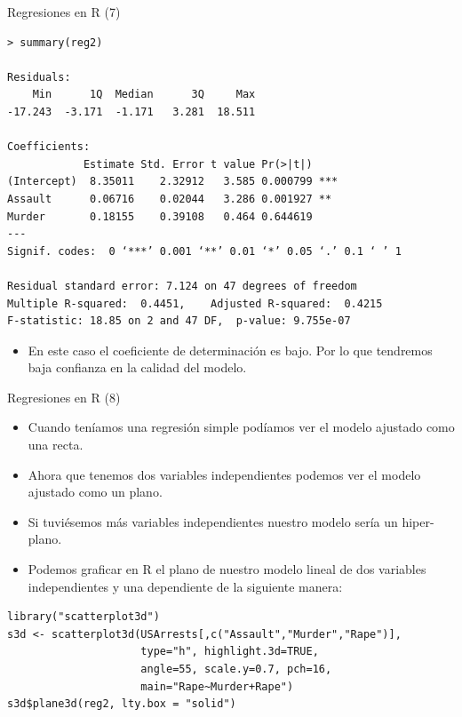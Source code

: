 \documentclass[handout]{beamer}
\begin{document}
\begin{frame}[fragile]{Regresiones en R (7)}
\scriptsize{

\begin{verbatim}
> summary(reg2)

Residuals:
    Min      1Q  Median      3Q     Max 
-17.243  -3.171  -1.171   3.281  18.511 

Coefficients:
            Estimate Std. Error t value Pr(>|t|)    
(Intercept)  8.35011    2.32912   3.585 0.000799 ***
Assault      0.06716    0.02044   3.286 0.001927 ** 
Murder       0.18155    0.39108   0.464 0.644619    
---
Signif. codes:  0 ‘***’ 0.001 ‘**’ 0.01 ‘*’ 0.05 ‘.’ 0.1 ‘ ’ 1

Residual standard error: 7.124 on 47 degrees of freedom
Multiple R-squared:  0.4451,	Adjusted R-squared:  0.4215 
F-statistic: 18.85 on 2 and 47 DF,  p-value: 9.755e-07

\end{verbatim}

\begin{itemize}
\item En este caso el coeficiente de determinación es bajo. Por lo que tendremos baja confianza en la calidad del modelo.
 \end{itemize}
 

} 
\end{frame}

\begin{frame}[fragile]{Regresiones en R (8)}
\scriptsize{
\begin{itemize}
 \item Cuando teníamos una regresión simple podíamos ver el modelo ajustado como una recta.
 \item Ahora que tenemos dos variables independientes podemos ver el modelo ajustado como un plano.
 \item Si tuviésemos más variables independientes nuestro modelo sería un hiper-plano.
 \item Podemos graficar en R el plano de nuestro modelo lineal de dos variables independientes y una dependiente de la siguiente manera:
 \end{itemize}

\begin{verbatim}
library("scatterplot3d")
s3d <- scatterplot3d(USArrests[,c("Assault","Murder","Rape")],
                     type="h", highlight.3d=TRUE,
                     angle=55, scale.y=0.7, pch=16, 
                     main="Rape~Murder+Rape")
s3d$plane3d(reg2, lty.box = "solid")

\end{verbatim}




} 
\end{frame}
\end{document}
